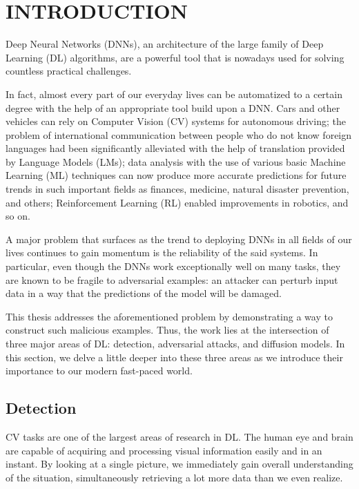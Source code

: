 
\chapter{INTRODUCTION}

Deep Neural Networks (DNNs), an architecture of the large family of Deep Learning (DL) algorithms, are a powerful tool that is nowadays used for solving countless practical challenges.

In fact, almost every part of our everyday lives can be automatized to a certain degree with the help of an appropriate tool build upon a DNN.
Cars and other vehicles can rely on Computer Vision (CV) systems for autonomous driving; the problem of international communication between people who do not know foreign languages had been significantly alleviated with the help of translation provided by Language Models (LMs); data analysis with the use of various basic Machine Learning (ML) techniques can now produce more accurate predictions for future trends in such important fields as finances, medicine, natural disaster prevention, and others; Reinforcement Learning (RL) enabled improvements in robotics, and so on.

A major problem that surfaces as the trend to deploying DNNs in all fields of our lives continues to gain momentum is the reliability of the said systems.
In particular, even though the DNNs work exceptionally well on many tasks, they are known to be fragile to adversarial examples: an attacker can perturb input data in a way that the predictions of the model will be damaged.

This thesis addresses the aforementioned problem by demonstrating a way to construct such malicious examples. 
Thus, the work lies at the intersection of three major areas of DL: detection, adversarial attacks, and diffusion models.
In this section, we delve a little deeper into these three areas as we introduce their importance to our modern fast-paced world.


\section{Detection}

CV tasks are one of the largest areas of research in DL.
The human eye and brain are capable of acquiring and processing visual information easily and in an instant.
By looking at a single picture, we immediately gain overall understanding of the situation, simultaneously retrieving a lot more data than we even realize. 

